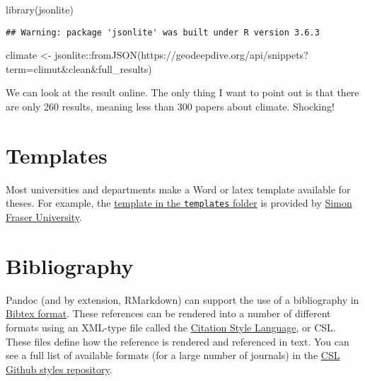 \documentclass[
]{article}
\newenvironment{Shaded}{\begin{snugshade}}{\end{snugshade}}
\newcommand{\FunctionTok}[1]{\textcolor[rgb]{0.00,0.00,0.00}{#1}}
\newcommand{\NormalTok}[1]{#1}
\newcommand{\OtherTok}[1]{\textcolor[rgb]{0.56,0.35,0.01}{#1}}
\newcommand{\SpecialCharTok}[1]{\textcolor[rgb]{0.00,0.00,0.00}{#1}}
\newcommand{\StringTok}[1]{\textcolor[rgb]{0.31,0.60,0.02}{#1}}
\begin{document}
\begin{Shaded}
\begin{Highlighting}[]
\FunctionTok{library}\NormalTok{(jsonlite)}
\end{Highlighting}
\end{Shaded}

\begin{verbatim}
## Warning: package 'jsonlite' was built under R version 3.6.3
\end{verbatim}

\begin{Shaded}
\begin{Highlighting}[]
\NormalTok{climate }\OtherTok{\textless{}{-}}\NormalTok{ jsonlite}\SpecialCharTok{::}\FunctionTok{fromJSON}\NormalTok{(}\StringTok{\textquotesingle{}https://geodeepdive.org/api/snippets?term=climut\&clean\&full\_results\textquotesingle{}}\NormalTok{)}
\end{Highlighting}
\end{Shaded}

We can look at the result online. The only thing I want to point out is
that there are only 260 results, meaning less than 300 papers about
climate. Shocking!

\hypertarget{templates}{%
\section{Templates}\label{templates}}

Most universities and departments make a Word or latex template
available for theses. For example, the
\href{templates/thesistemplate.docx}{template in the \texttt{templates}
folder} is provided by
\href{https://www.lib.sfu.ca/help/publish/thesis/templates}{Simon Fraser
University}.

\hypertarget{bibliography}{%
\section{Bibliography}\label{bibliography}}

Pandoc (and by extension, RMarkdown) can support the use of a
bibliography in \href{http://www.bibtex.org/}{Bibtex format}. These
references can be rendered into a number of different formats using an
XML-type file called the \href{https://citationstyles.org/}{Citation
Style Language}, or CSL. These files define how the reference is
rendered and referenced in text. You can see a full list of available
formats (for a large number of journals) in the
\href{https://github.com/citation-style-language/styles}{CSL Github
styles repository}.
\end{document}
